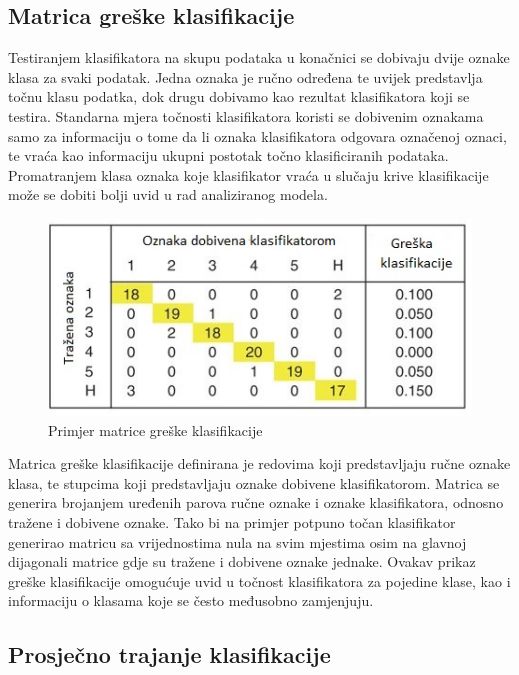\documentclass[lmodern, utf8, diplomski, numeric]{fer}
\begin{document}
\subsection{Matrica greške klasifikacije}

Testiranjem klasifikatora na skupu podataka u konačnici se dobivaju dvije oznake klasa za svaki podatak. Jedna oznaka je ručno određena te uvijek predstavlja točnu klasu podatka, dok drugu dobivamo kao rezultat klasifikatora koji se testira. Standarna mjera točnosti klasifikatora koristi se dobivenim oznakama samo za informaciju o tome da li oznaka klasifikatora odgovara označenoj oznaci, te vraća kao informaciju ukupni postotak točno klasificiranih podataka. Promatranjem klasa oznaka koje klasifikator vraća u slučaju krive klasifikacije može se dobiti bolji uvid u rad analiziranog modela. 

\begin{figure}[ht!]
\centering
\includegraphics[width=12cm]{slike/confusion_matrix.jpg}
\caption{Primjer matrice greške klasifikacije}
\end{figure}

Matrica greške klasifikacije definirana je redovima koji predstavljaju ručne oznake klasa, te stupcima koji predstavljaju oznake dobivene klasifikatorom. Matrica se generira brojanjem uređenih parova ručne oznake i oznake klasifikatora, odnosno tražene i dobivene oznake. Tako bi na primjer potpuno točan klasifikator generirao matricu sa vrijednostima nula na svim mjestima osim na glavnoj dijagonali matrice gdje su tražene i dobivene oznake jednake.
Ovakav prikaz greške klasifikacije omogućuje uvid u točnost klasifikatora za pojedine klase, kao i informaciju o klasama koje se često međusobno zamjenjuju.



\subsection{Prosječno trajanje klasifikacije}
\end{document}
